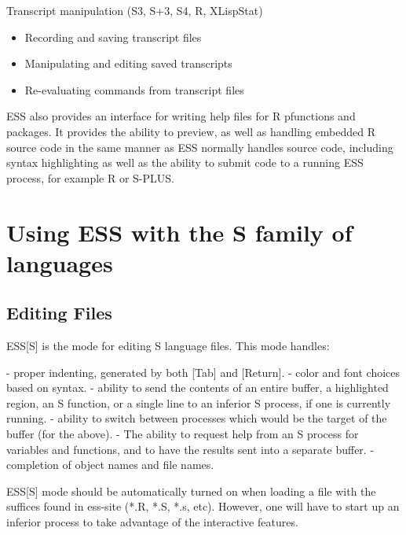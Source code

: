 \documentclass{article}
\begin{document}
Transcript manipulation (S3, S+3, S4, R, XLispStat)
\begin{itemize}
\item Recording and saving transcript files
\item Manipulating and editing saved transcripts
\item Re-evaluating commands from transcript files
\end{itemize}

ESS also provides an interface for writing help files for R pfunctions
and packages.    It provides the ability to preview, as well as
handling embedded R source code in the same manner as ESS normally
handles source code, including syntax highlighting as well as the
ability to submit code to a running ESS process, for example R or
S-PLUS. 


\section{Using ESS with the S family of languages}
\label{sec:S}

\subsection{Editing Files}
\label{sec:S:edit}


ESS[S] is the mode for editing S language files.  This mode handles:

- proper indenting, generated by both [Tab] and [Return].
- color and font choices based on syntax.
- ability to send the contents of an entire buffer, a highlighted
  region, an S function, or a single line to an inferior S process, if
  one is currently running.
- ability to switch between processes which would be the target of the 
  buffer (for the above).
- The ability to request help from an S process for variables and
  functions, and to have the results sent into a separate buffer.
- completion of object names and file names.

ESS[S] mode should be automatically turned on when loading a file with
the suffices found in ess-site (*.R, *.S, *.s, etc).  However, one
will have to start up an inferior process to take advantage of the
interactive features.
\end{document}
